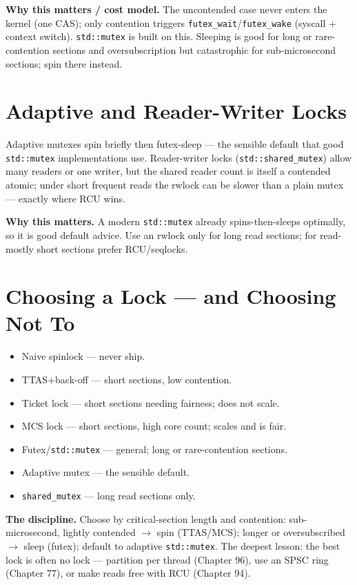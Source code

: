 \textbf{Why this matters / cost model.} The uncontended case never enters the kernel (one CAS); only contention triggers \texttt{futex\_wait}/\texttt{futex\_wake} (syscall + context switch). \texttt{std::mutex} is built on this. Sleeping is good for long or rare-contention sections and oversubscription but catastrophic for sub-microsecond sections; spin there instead.

\section{Adaptive and Reader-Writer Locks}
Adaptive mutexes spin briefly then futex-sleep --- the sensible default that good \texttt{std::mutex} implementations use. Reader-writer locks (\texttt{std::shared\_mutex}) allow many readers or one writer, but the shared reader count is itself a contended atomic; under short frequent reads the rwlock can be slower than a plain mutex --- exactly where RCU wins.

\textbf{Why this matters.} A modern \texttt{std::mutex} already spins-then-sleeps optimally, so it is good default advice. Use an rwlock only for long read sections; for read-mostly short sections prefer RCU/seqlocks.

\section{Choosing a Lock --- and Choosing Not To}
\begin{itemize}
\item Naive spinlock --- never ship.
\item TTAS+back-off --- short sections, low contention.
\item Ticket lock --- short sections needing fairness; does not scale.
\item MCS lock --- short sections, high core count; scales and is fair.
\item Futex/\texttt{std::mutex} --- general; long or rare-contention sections.
\item Adaptive mutex --- the sensible default.
\item \texttt{shared\_mutex} --- long read sections only.
\end{itemize}

\textbf{The discipline.} Choose by critical-section length and contention: sub-microsecond, lightly contended $\to$ spin (TTAS/MCS); longer or oversubscribed $\to$ sleep (futex); default to adaptive \texttt{std::mutex}. The deepest lesson: the best lock is often no lock --- partition per thread (Chapter 96), use an SPSC ring (Chapter 77), or make reads free with RCU (Chapter 94).
